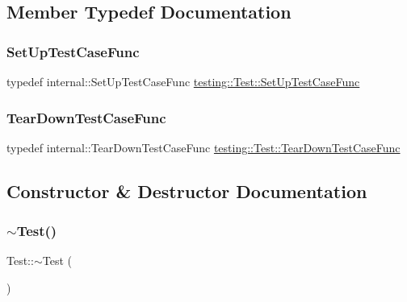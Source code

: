 \subsection{Member Typedef Documentation}
\mbox{\label{classtesting_1_1Test_a5f2a051d1d99c9b784c666c586186cf9}} 
\subsubsection{\texorpdfstring{SetUpTestCaseFunc}{SetUpTestCaseFunc}}
{\footnotesize\ttfamily typedef internal\+::\+Set\+Up\+Test\+Case\+Func \mbox{\hyperlink{classtesting_1_1Test_a5f2a051d1d99c9b784c666c586186cf9}{testing\+::\+Test\+::\+Set\+Up\+Test\+Case\+Func}}}

\mbox{\label{classtesting_1_1Test_aa0f532e93b9f3500144c53f31466976c}} 
\subsubsection{\texorpdfstring{TearDownTestCaseFunc}{TearDownTestCaseFunc}}
{\footnotesize\ttfamily typedef internal\+::\+Tear\+Down\+Test\+Case\+Func \mbox{\hyperlink{classtesting_1_1Test_aa0f532e93b9f3500144c53f31466976c}{testing\+::\+Test\+::\+Tear\+Down\+Test\+Case\+Func}}}



\subsection{Constructor \& Destructor Documentation}
\mbox{\label{classtesting_1_1Test_a2b0a62f1e667bbe8d8cb18d785bfa991}} 
\subsubsection{\texorpdfstring{$\sim$Test()}{~Test()}}
{\footnotesize\ttfamily Test\+::$\sim$\+Test (\begin{DoxyParamCaption}{ }\end{DoxyParamCaption})\hspace{0.3cm}{\ttfamily [virtual]}}

